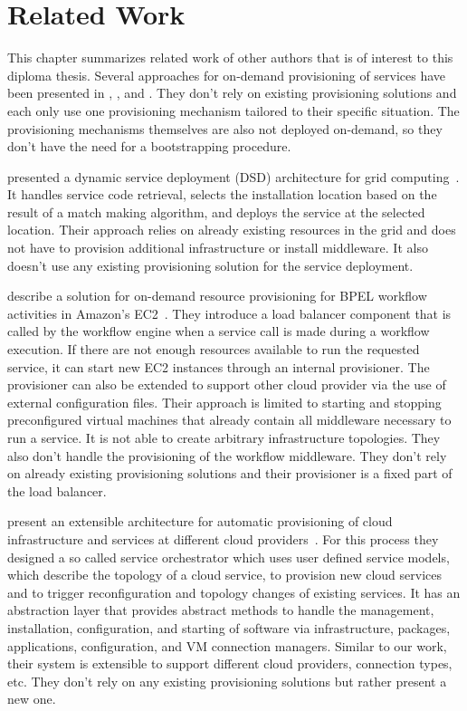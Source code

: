 \chapter{Related Work}
\label{related}

This chapter summarizes related work of other authors that is of interest to this diploma thesis.
Several approaches for on-demand provisioning of services have been presented in \autocite{applyingwebservice}, \autocite{ondemandbpel}, and \autocite{provisioning:architecture}.
They don't rely on existing provisioning solutions and each only use one provisioning mechanism tailored to their specific situation.
The provisioning mechanisms themselves are also not deployed on-demand, so they don't have the need for a bootstrapping procedure.

\citeauthor*{applyingwebservice} presented a dynamic service deployment (DSD) architecture for grid computing~\autocite{applyingwebservice}.
It handles service code retrieval, selects the installation location based on the result of a match making algorithm, and deploys the service at the selected location.
Their approach relies on already existing resources in the grid and does not have to provision additional infrastructure or install middleware.
It also doesn't use any existing provisioning solution for the service deployment.

\citeauthor*{ondemandbpel} describe a solution for on-demand resource provisioning for BPEL workflow activities in Amazon's EC2~\autocite{ondemandbpel}.
They introduce a load balancer component that is called by the workflow engine when a service call is made during a workflow execution.
If there are not enough resources available to run the requested service, it can start new EC2 instances through an internal provisioner.
The provisioner can also be extended to support other cloud provider via the use of external configuration files.
Their approach is limited to starting and stopping preconfigured virtual machines that already contain all middleware necessary to run a service.
It is not able to create arbitrary infrastructure topologies.
They also don't handle the provisioning of the workflow middleware.
They don't rely on already existing provisioning solutions and their provisioner is a fixed part of the load balancer.

\citeauthor*{provisioning:architecture} present an extensible architecture for automatic provisioning of cloud infrastructure and services at different cloud providers~\autocite{provisioning:architecture}.
For this process they designed a so called service orchestrator which uses user defined service models, which describe the topology of a cloud service, to provision new cloud services and to trigger reconfiguration and topology changes of existing services.
It has an abstraction layer that provides abstract methods to handle the management, installation, configuration, and starting of software via infrastructure, packages, applications, configuration, and VM connection managers.
Similar to our work, their system is extensible to support different cloud providers, connection types, etc.
They don't rely on any existing provisioning solutions but rather present a new one.

